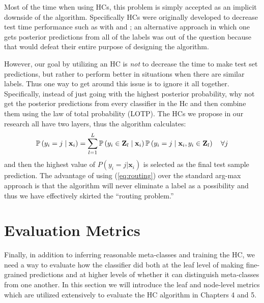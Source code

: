 \documentclass[../thesis.tex]{subfiles}
\begin{document}
Most of the time when using HCs, this problem is simply accepted as an implicit
downside of the algorithm. Specifically HCs were originally developed to
decrease test time performance such as with \cite{vural2004hierarchical} and
\cite{bengio2010label}; an alternative approach in which one gets posterior
predictions from all of the labels was out of the question because that would
defeat their entire purpose of designing the algorithm.

However, our goal by utilizing an HC is \textit{not} to decrease the time to
make test set predictions, but rather to perform better in situations when there
are similar labels. Thus one way to get around this issue is to ignore it all
together. Specifically, instead of just going with the highest posterior
probability, why not get the posterior predictions from every classifier in the
Hc and then combine them using the law of total probability (LOTP). The HCs we
propose in our research all have two layers, thus the algorithm calculates:
\begin{equation}
    \label{eq:routing}
    \P\left(y_i = j \mid \mathbf{x}_i \right) = \sum_{l=1}^L \P\left(y_i \in
    \mathbf{Z}_l \mid \mathbf{x}_i\right) \P\left(y_i = j \mid \mathbf{x}_i,
    y_i \in \mathbf{Z}_l\right) \quad \forall j
\end{equation}
and then the highest value of $P(y_i = j | \mathbf{x}_i)$ is selected as the
final test sample prediction. The advantage of using (\ref{eq:routing}) over the
standard arg-max approach is that the algorithm will never eliminate a label as
a possibility and thus we have effectively skirted the ``routing problem.''

\section{Evaluation Metrics}
Finally, in addition to inferring reasonable meta-classes and training the HC,
we need a way to evaluate how the classifier did both at the leaf level of
making fine-grained predictions and at higher levels of whether it can
distinguish meta-classes from one another. In this section we will introduce the
leaf and node-level metrics which are utilized extensively to evaluate the HC
algorithm in Chapters 4 and 5.
\end{document}
